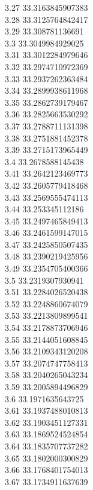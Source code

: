 {3.27	33.3163845907383\\
3.28	33.3125764842417\\
3.29	33.308781136691\\
3.3	33.3049984929025\\
3.31	33.3012284979646\\
3.32	33.2974710972369\\
3.33	33.2937262363484\\
3.34	33.2899938611968\\
3.35	33.2862739179467\\
3.36	33.2825663530292\\
3.37	33.2788711131398\\
3.38	33.2751881452378\\
3.39	33.2715173965449\\
3.4	33.2678588145438\\
3.41	33.2642123469773\\
3.42	33.2605779418468\\
3.43	33.2569555474113\\
3.44	33.253345112186\\
3.45	33.2497465849413\\
3.46	33.2461599147015\\
3.47	33.2425850507435\\
3.48	33.2390219425956\\
3.49	33.2354705400366\\
3.5	33.2319307930941\\
3.51	33.2284026520438\\
3.52	33.2248860674079\\
3.53	33.2213809899541\\
3.54	33.2178873706946\\
3.55	33.2144051608845\\
3.56	33.2109343120208\\
3.57	33.2074747758413\\
3.58	33.2040265043234\\
3.59	33.2005894496829\\
3.6	33.1971635643725\\
3.61	33.1937488010813\\
3.62	33.1903451127331\\
3.63	33.1869524524854\\
3.64	33.1835707737282\\
3.65	33.1802000300829\\
3.66	33.1768401754013\\
3.67	33.1734911637639\\
}

